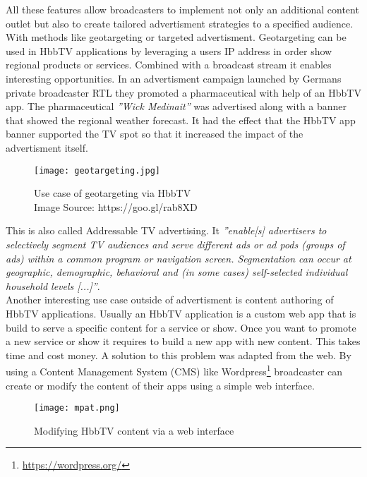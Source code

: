 All these features allow broadcasters to implement not only an additional content outlet but also
to create tailored advertisment strategies to a specified audience. With methods like geotargeting
or targeted advertisment. Geotargeting can be used in HbbTV applications by leveraging a users
IP address in order show regional products or services. Combined with a broadcast stream it
enables interesting opportunities. In an advertisment campaign launched by Germans private
broadcaster RTL they promoted a pharmaceutical with help of an HbbTV app. The pharmaceutical
\textit{''Wick Medinait''} was advertised along with a banner that showed the regional weather
forecast. It had the effect that the HbbTV app banner supported the TV spot so that it increased
the impact of the advertisment itself.

\begin{figure}[htb]
  \centering
  \texttt{[image: geotargeting.jpg]}\\
  \caption{
    Use case of geotargeting via HbbTV\\
    {\tiny Image Source: https://goo.gl/rab8XD}
  }
  \label{fig:geotargeting}
\end{figure}

This is also called Addressable TV advertising. It \textit{''enable[s] advertisers to selectively
segment TV audiences and serve different ads or ad pods (groups of ads) within a common program or
navigation screen. Segmentation can occur at geographic, demographic, behavioral and (in some cases)
self-selected individual household levels [...]''}\cite{adrTV}.\\
Another interesting use case outside of advertisment is content authoring of HbbTV applications.
Usually an HbbTV application is a custom web app that is build to serve a specific content for
a service or show. Once you want to promote a new service or show it requires to build a new
app with new content. This takes time and cost money. A solution to this problem was adapted from
the web. By using a Content Management System (CMS) like Wordpress\footnote{\url{https://wordpress.org/}}
broadcaster can create or modify the content of their apps using a simple web interface.

\begin{figure}[htb]
  \centering
  \texttt{[image: mpat.png]}\\
  \caption{
    Modifying HbbTV content via a web interface
  }
  \label{fig:mpat}
\end{figure}


